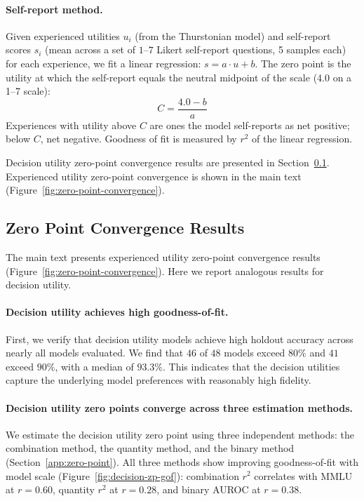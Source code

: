\paragraph{Self-report method.}
Given experienced utilities $u_i$ (from the Thurstonian model) and self-report scores $s_i$ (mean across a set of $1$--$7$ Likert self-report questions, 5 samples each) for each experience, we fit a linear regression: $s = a \cdot u + b$. The zero point is the utility at which the self-report equals the neutral midpoint of the scale (4.0 on a 1--7 scale):
\begin{equation*}
C = \frac{4.0 - b}{a}
\end{equation*}
Experiences with utility above $C$ are ones the model self-reports as net positive; below $C$, net negative.
Goodness of fit is measured by $r^2$ of the linear regression.

Decision utility zero-point convergence results are presented in Section~\ref{app:decision-zp-results}. Experienced utility zero-point convergence is shown in the main text (Figure~\ref{fig:zero-point-convergence}).

\subsection{Zero Point Convergence Results}
\label{app:decision-zp-results}
The main text presents experienced utility zero-point convergence results (Figure~\ref{fig:zero-point-convergence}). Here we report analogous results for decision utility.

\paragraph{Decision utility achieves high goodness-of-fit.}
First, we verify that decision utility models achieve high holdout accuracy across nearly all models evaluated. We find that $46$ of $48$ models exceed $80\%$ and $41$ exceed $90\%$, with a median of $93.3\%$. This indicates that the decision utilities capture the underlying model preferences with reasonably high fidelity.

\paragraph{Decision utility zero points converge across three estimation methods.}
We estimate the decision utility zero point using three independent methods: the combination method, the quantity method, and the binary method (Section~\ref{app:zero-point}). All three methods show improving goodness-of-fit with model scale (Figure~\ref{fig:decision-zp-gof}): combination $r^2$ correlates with MMLU at $r = 0.60$, quantity $r^2$ at $r = 0.28$, and binary AUROC at $r = 0.38$.

